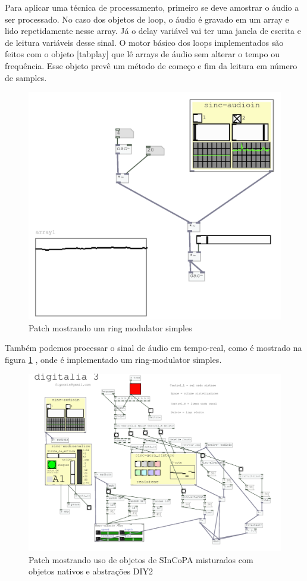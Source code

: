 \documentclass{ppgmus}
\begin{document}
Para aplicar uma técnica de processamento, primeiro se deve amostrar
o áudio a ser processado. No caso dos objetos de loop, o áudio é gravado
em um array e lido repetidamente nesse array. Já o delay variável vai ter uma
janela de escrita e de leitura variáveis desse sinal. O motor básico dos loops 
implementados são feitos com o objeto [tabplay\texttildelow] que lê arrays
de áudio sem alterar o tempo ou frequência. Esse objeto prevê um método de começo e fim
da leitura em número de samples.

\begin{figure}
\includegraphics[scale=.7]{sinc-ring}
\caption{Patch mostrando um ring modulator simples}
\label{sinc-ring}
\end{figure}


Também podemos processar o sinal de áudio em tempo-real, como é mostrado na 
figura \ref{sinc-ring} , onde é implementado um ring-modulator simples.


\begin{figure}
\includegraphics[scale=.5]{digitalia3}
\caption{Patch mostrando uso de objetos de SInCoPA misturados com objetos nativos e abstrações DIY2}
\label{digitalia3}
\end{figure}
\end{document}
